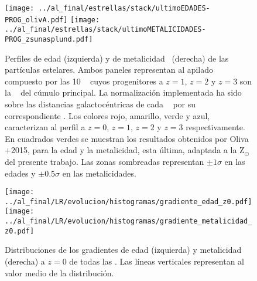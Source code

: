 \begin{figure}[H]
 \texttt{[image: ../al\_final/estrellas/stack/ultimoEDADES-PROG\_olivA.pdf]}
 \texttt{[image: ../al\_final/estrellas/stack/ultimoMETALICIDADES-PROG\_zsunasplund.pdf]}
\caption{Perfiles de edad (izquierda) y de metalicidad\protect\footnotemark~ (derecha) de las part\'iculas estelares.
Ambos paneles representan al apilado compuesto por las 10 \bcgs~ cuyos progenitores a $z=1$, $z=2$ y $z=3$ son la \bcg~ del c\'umulo principal.
La normalizaci\'on implementada ha sido sobre las distancias galactoc\'entricas de cada \bcg~ por su correspondiente \rvc.
Los colores rojo, amarillo, verde y azul, caracterizan al perfil
a $z=0$, $z=1$, $z=2$ y $z=3$ respectivamente. En cuadrados verdes se muestran los resultados obtenidos por Oliva$+$2015,
para la edad y la metalicidad, esta \'ultima, adaptada a la Z$_{\odot}$ del presente trabajo.
Las zonas sombreadas representan $\pm 1\sigma$ en las edades y $\pm 0.5\sigma$ en las metalicidades.}
\label{fig:edad}
\end{figure}








\begin{figure}[H]
 \texttt{[image: ../al\_final/LR/evolucion/histogramas/gradiente\_edad\_z0.pdf]}
 \texttt{[image: ../al\_final/LR/evolucion/histogramas/gradiente\_metalicidad\_z0.pdf]}
\caption{Distribuciones de los gradientes de edad (izquierda) y metalicidad (derecha) a $z=0$ de todas las \bcgs. Las l\'ineas verticales representan
al valor medio de la distribuci\'on.}
\label{fig:gradientes}
\end{figure}



